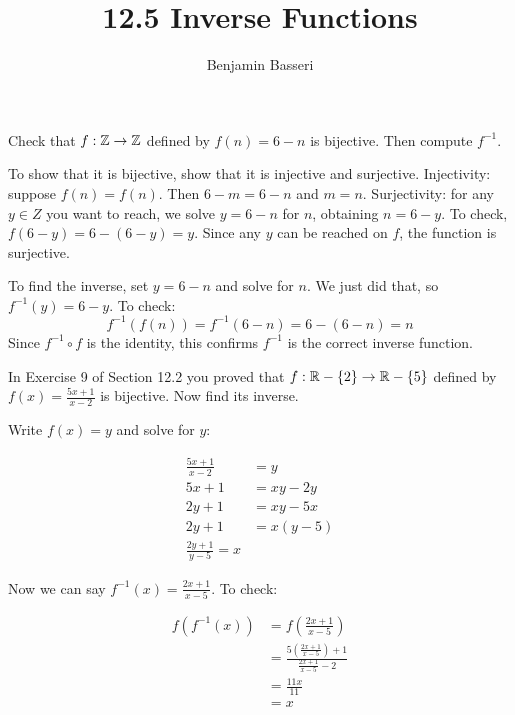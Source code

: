 \documentclass{article}
\title{12.5 Inverse Functions}
\author{Benjamin Basseri}
\begin{document}
\maketitle
\begin{problem}
Check that $f: \mathbb{Z} \to \mathbb{Z}$ defined by $f(n) = 6 - n$ is bijective. Then compute $f^{-1}$.
\end{problem}

To show that it is bijective, show that it is injective and surjective. Injectivity: suppose $f(n) = f(n)$. Then $6 - m = 6 - n$ and $m = n$. Surjectivity: for any $y \in Z$ you want to reach, we solve $y = 6 - n$ for $n$, obtaining $n = 6 -y$. To check, $f(6 - y) = 6 - (6 - y) = y$. Since any $y$ can be reached on $f$, the function is surjective.

To find the inverse, set $y = 6 - n$ and solve for $n$. We just did that, so $f^{-1}(y) = 6 - y$. To check:
$$f^{-1}(f(n)) = f^{-1}(6 - n) = 6 - (6 - n) = n$$
Since $f^{-1} \circ f$ is the identity, this confirms $f^{-1}$ is the correct inverse function.

\begin{problem}
In Exercise 9 of Section 12.2 you proved that $f: \mathbb{R} - \{2\} \to \mathbb{R} - \{5\}$ defined by $f(x) = \frac{5x + 1}{x -2}$ is bijective. Now find its inverse.
\end{problem}


Write $f(x) = y$ and solve for $y$:

\begin{align*}
  \frac{5x + 1}{x - 2} & = y       \\
  5x + 1               & = xy - 2y \\
  2y + 1               & = xy - 5x \\
  2y + 1               & = x(y-5)  \\
  \frac{2y + 1}{y - 5} = x
\end{align*}

Now we can say $f^{-1}(x) = \frac{2x + 1}{x - 5}$. To check:

\begin{align*}
  f(f^{-1}(x)) & = f\left(\frac{2x + 1}{x - 5}\right)                                    \\
               & = \frac{5\left(\frac{2x + 1}{x - 5}\right) + 1}{\frac{2x + 1}{x - 5}-2} \\
               & = \frac{11x}{11}                                                        \\
               & = x
\end{align*}
\end{document}
